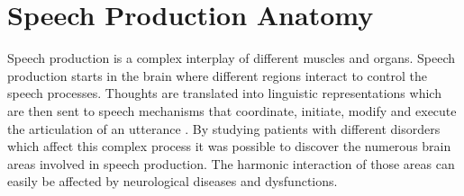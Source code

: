 \begin{comment}
\begin{figure}[htbp]
\centering
 \subbottom[Example of games that can be used for SLP therapy.Descriptive game from ]{%
    \texttt{[image: gameSLP]}}%
 \subbottom[Electrglottograph also called laryngograph]{%
    \hspace{0.5cm}\texttt{[image: egg]}}
 \subbottom[Airflow machine]{%
    \texttt{[image: airflow\_machine]}}%
    \subbottom[ultrasound]{%
    \hspace{0.5cm}\texttt{[image: ultrasoundhat]}} 
 \subbottom[Palatometer with electrodes]{%
    \texttt{[image: palatometer]}}    	
\subbottom[Smart palate]{%
    \hspace{0.5cm}\texttt{[image: smartpalate]}}%
 
\caption{Devices used by SLPs}
\label{fig:tools}
\end{figure}





\end{comment}



\section{Speech Production Anatomy}
Speech production is a complex interplay of different muscles and organs. Speech production starts in the brain where different regions interact to control the speech processes. Thoughts are translated into linguistic representations which are then sent to speech mechanisms that coordinate, initiate, modify and execute the articulation of an utterance \cite{Dronkers2004}. By studying patients with different disorders which affect this complex process it was possible to discover the numerous brain areas involved in speech production. The harmonic interaction of those areas can easily be affected by neurological diseases and dysfunctions. 

